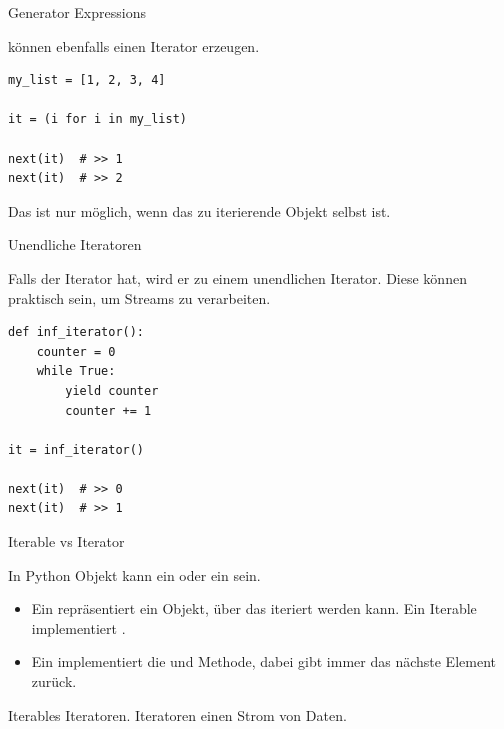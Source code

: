\documentclass[12pt, aspectratio=169, usepdftitle=false]{beamer}
\newcommand{\pp}[1]{\lpl{#1}}
\begin{document}
\begin{frame}[fragile]{Generator Expressions}

     können ebenfalls einen Iterator erzeugen.
    
    \medskip

    \begin{lstlisting}[language=pytiny]
my_list = [1, 2, 3, 4]

it = (i for i in my_list)

next(it)  # >> 1
next(it)  # >> 2
    \end{lstlisting}

Das ist nur möglich, wenn das zu iterierende Objekt selbst  ist.

\end{frame}

\begin{frame}[fragile]{Unendliche Iteratoren}

    Falls der Iterator  hat, wird er zu einem unendlichen Iterator. Diese können praktisch sein, um Streams zu verarbeiten.

    \begin{lstlisting}[language=pytiny]
def inf_iterator():
    counter = 0
    while True:
        yield counter
        counter += 1

it = inf_iterator()

next(it)  # >> 0
next(it)  # >> 1
    \end{lstlisting}

\end{frame}

\begin{frame}{Iterable vs Iterator}
    
    In Python Objekt kann ein  oder ein  sein.
    \begin{itemize}
        \item Ein  repräsentiert ein Objekt, über das iteriert werden kann. Ein Iterable implementiert \pp{__iter__()}.
        \item Ein  implementiert die \pp{__iter__()} und \pp{__next__()} Methode, dabei gibt \pp{__next__()} immer das nächste Element zurück.
    \end{itemize}

    Iterables  Iteratoren. Iteratoren  einen Strom von Daten.

\end{frame}
\end{document}
